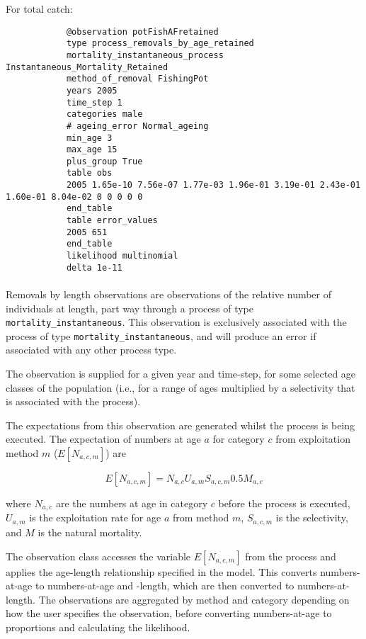\begin{itemize}
	For total catch:
	
	{\small{\begin{verbatim}
			@observation potFishAFretained
			type process_removals_by_age_retained
			mortality_instantaneous_process Instantaneous_Mortality_Retained
			method_of_removal FishingPot
			years 2005
			time_step 1
			categories male
			# ageing_error Normal_ageing
			min_age 3
			max_age 15
			plus_group True
			table obs
			2005 1.65e-10 7.56e-07 1.77e-03 1.96e-01 3.19e-01 2.43e-01 1.60e-01 8.04e-02 0 0 0 0 0
			end_table
			table error_values
			2005 651
			end_table
			likelihood multinomial
			delta 1e-11
			\end{verbatim}}}
	
	\paragraph*{\label{sec:removals-by-length}}\label{sec:Observation-ProcessRemovalsByLength}
	
	Removals by length observations are observations of the relative number of individuals at length, part way through a process of type \texttt{mortality\_instantaneous}. This observation is exclusively associated with the process of type \texttt{mortality\_instantaneous}, and will produce an error if associated with any other process type.
	
	The observation is supplied for a given year and time-step, for some selected age classes of the population (i.e., for a range of ages multiplied by a selectivity that is associated with the process).
	
	The expectations from this observation are generated whilst the process is being executed. The expectation of numbers at age $a$ for category $c$ from exploitation method $m$ ($E[N_{a,c,m}]$) are
	
	\begin{equation}
	E[N_{a,c,m}] = N_{a,c} U_{a,m} S_{a,c,m} 0.5 M_{a,c}
	\end{equation}
	
	where $N_{a,c}$ are the numbers at age in category $c$ before the process is executed, $U_{a,m}$ is the exploitation rate for age $a$ from method $m$, $S_{a,c,m}$ is the selectivity, and $M$ is the natural mortality.
	
	The observation class accesses the variable $E[N_{a,c,m}]$ from the process and applies the age-length relationship specified in the model. This converts numbers-at-age to numbers-at-age and -length, which are then converted to numbers-at-length. The observations are aggregated by method and category depending on how the user specifies the observation, before converting numbers-at-age to proportions and calculating the likelihood.
	

\end{itemize}
